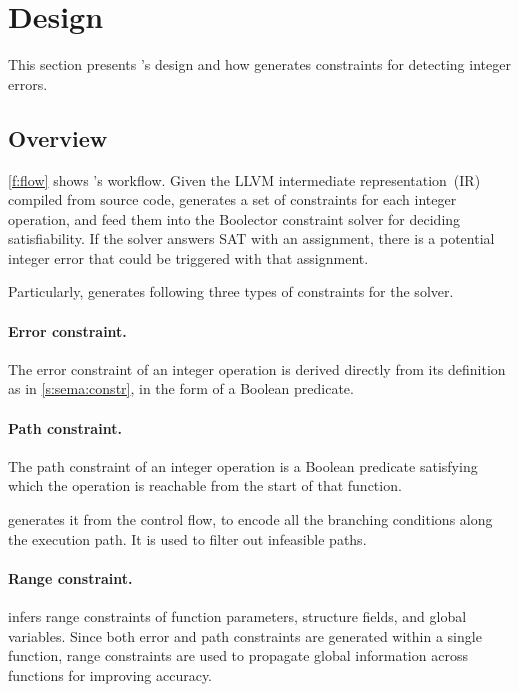 \section{Design}
\label{s:gen}

This section presents \sys's design and how \sys generates constraints
for detecting integer errors.

\subsection{Overview}

\autoref{f:flow} shows \sys's workflow.  Given the LLVM intermediate
representation~(IR) compiled from source code, \sys generates a set
of constraints for each integer operation, and feed them into the
Boolector constraint solver for deciding satisfiability.  If the
solver answers SAT with an assignment, there is a potential integer
error that could be triggered with that assignment.

Particularly, \sys generates following three types of constraints
for the solver.

\paragraph{Error constraint.}
The error constraint of an integer operation is derived directly
from its definition as in \autoref{s:sema:constr}, in the form of
a Boolean predicate.

\paragraph{Path constraint.}
The path constraint of an integer operation is a Boolean predicate
satisfying which the operation is reachable from the start of that
function.

\sys generates it from the control flow, to encode all
the branching conditions along the execution path.  It is used to
filter out infeasible paths.

\paragraph{Range constraint.}
\sys infers range constraints of function parameters, structure
fields, and global variables.  Since both error and path constraints
are generated within a single function, range constraints are used
to propagate global information across functions for improving
accuracy.


